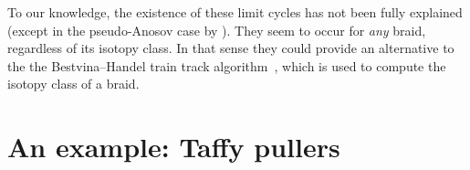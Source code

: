 \documentclass[12pt]{article}
\begin{document}
To our knowledge, the existence of these limit cycles has not been fully
explained (except in the pseudo-Anosov case by \citet{Yurttas2014_preprint}).
They seem to occur for \emph{any} braid, regardless of its %
%
isotopy class.  In that sense they could provide an alternative to the the
Bestvina--Handel train track algorithm~\citep{Bestvina1995}, %
%
which is used to compute the isotopy class of a braid.

%
%
%


\section{An example: Taffy pullers}
\label{sec:taffy}

\end{document}
